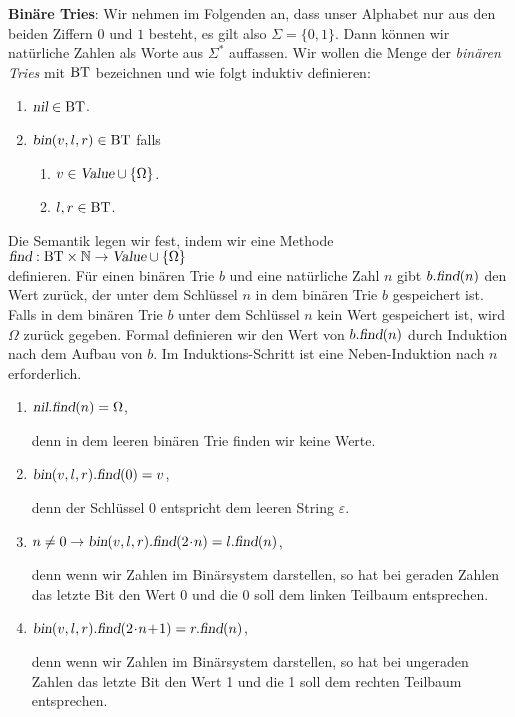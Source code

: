 \noindent
\textbf{Bin\"are Tries}:  Wir nehmen im Folgenden an, dass unser Alphabet nur aus den beiden
Ziffern $0$ und $1$ besteht, es gilt also $\Sigma = \{0,1\}$.  Dann k\"onnen wir nat\"urliche
Zahlen als Worte aus $\Sigma^*$ auffassen.  Wir wollen die Menge der \emph{bin\"aren Tries}
mit $\mathrm{BT}$ bezeichnen und wie folgt induktiv definieren:
\begin{enumerate}
\item $\textsl{nil} \in \mathrm{BT}$.
\item $\textsl{bin}(v,l,r) \in \mathrm{BT}$ falls
      \begin{enumerate}
      \item $v \in \textsl{Value} \cup \{\Omega\}$.
      \item $l,r \in \mathrm{BT}$.
      \end{enumerate}
\end{enumerate}
Die Semantik legen wir fest, indem wir eine Methode 
\\[0.2cm]
\hspace*{1.3cm}
$\textsl{find}: \mathrm{BT} \times \mathbb{N} \rightarrow \textsl{Value} \cup \{ \Omega \}$
\\[0.2cm]
definieren.  F\"ur einen bin\"aren Trie $b$ und eine nat\"urliche Zahl $n$ gibt
$b.\textsl{find}(n)$ den Wert zur\"uck, der unter dem Schl\"ussel $n$ in dem bin\"aren Trie $b$ gespeichert ist.
Falls in dem bin\"aren Trie $b$ unter dem Schl\"ussel $n$ kein Wert gespeichert ist, wird
$\Omega$ zur\"uck gegeben.
Formal definieren wir den Wert von $b.\textsl{find}(n)$ durch Induktion nach dem Aufbau
von $b$.  Im Induktions-Schritt ist eine Neben-Induktion nach $n$ erforderlich.
\begin{enumerate}
\item $\textsl{nil}.\textsl{find}(n) = \Omega$,

      denn in dem leeren bin\"aren Trie finden wir keine Werte.
\item $\textsl{bin}(v,l,r).\textsl{find}(0) = v$,

      denn der Schl\"ussel $0$ entspricht dem leeren String $\varepsilon$.
\item $n \not= 0 \rightarrow \textsl{bin}(v,l,r).\textsl{find}(2\!\cdot \!n) = l.\textsl{find}(n)$,

      denn wenn wir Zahlen im Bin\"arsystem darstellen, so hat bei geraden Zahlen das letzte
      Bit den Wert 0 und die 0 soll dem linken Teilbaum entsprechen.
\item $\textsl{bin}(v,l,r).\textsl{find}(2\!\cdot \!n\!+\!1) = r.\textsl{find}(n)$,

      denn wenn wir Zahlen im Bin\"arsystem darstellen, so hat bei ungeraden Zahlen das letzte
      Bit den Wert 1 und die 1 soll dem rechten Teilbaum entsprechen.
\end{enumerate}
